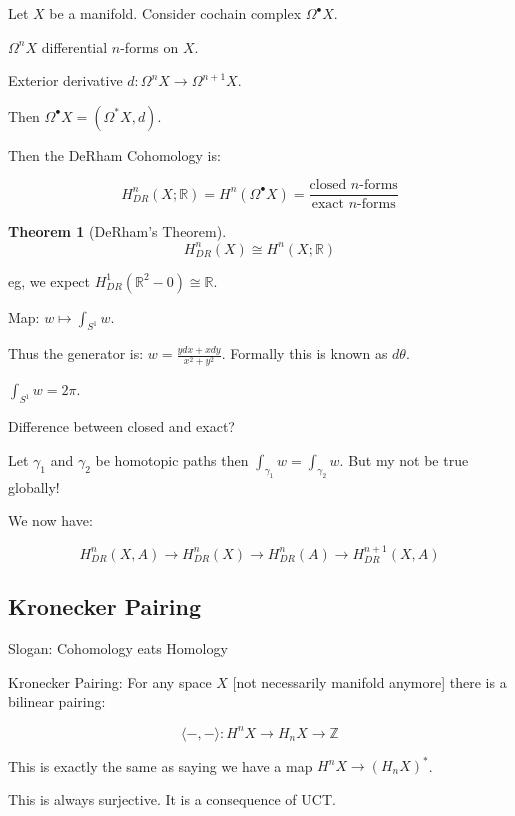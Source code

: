 \documentclass{article}
\theoremstyle{definition}
\newtheorem{theorem}{Theorem}
\begin{document}
    Let \(X\) be a manifold. Consider cochain complex \(\Omega^\bullet X\).

    \(\Omega^n X\) differential \(n\)-forms on \(X\).

    Exterior derivative \(d: \Omega^n X \to \Omega^{n+1} X\).

    Then \(\Omega^\bullet X = (\Omega^{\ast} X, d)\).

    Then the DeRham Cohomology is:

    \[
        H^n_{DR}(X;\mathbb{R}) = H^n(\Omega^\bullet X) = \frac{\text{closed \(n\)-forms}}{\text{exact \(n\)-forms}}
    \]

    \begin{theorem}
        [DeRham's Theorem]

        \[
            H^n_{DR}(X) \cong H^n(X;\mathbb{R})
        \]
    \end{theorem}

    eg, we expect \(H^1_{DR}(\mathbb{R}^2 - 0) \cong \mathbb{R}\).

    Map: \(w \mapsto \int_{S^1} w\).
    
    Thus the generator is: \(w = \frac{y dx + x dy}{x^2 + y^2}\). Formally this is known as \(d \theta\).

    \(\int_{S^1} w = 2\pi\).
    
    Difference between closed and exact?
    
    Let \(\gamma_1\) and \(\gamma_2\) be homotopic paths then \(\int_{\gamma_1} w = \int_{\gamma_2} w\). But my not be true globally!

    We now have:

    \[
        H^n_{DR}(X,A) \to H^n_{DR}(X) \to H^n_{DR}(A) \to H^{n+1}_{DR} (X,A)
    \]

    \subsection*{Kronecker Pairing}

    Slogan: Cohomology eats Homology

    Kronecker Pairing: For any space \(X\) [not necessarily manifold anymore] there is a bilinear pairing:

    \[
        \langle -,- \rangle : H^n X \to H_n X \to \mathbb{Z}
    \]

    This is exactly the same as saying we have a map \(H^n X \to (H_n X)^{\ast}\).

    This is always surjective. It is a consequence of UCT.
\end{document}
